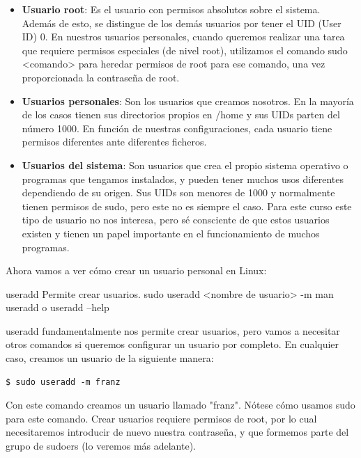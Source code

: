 \begin{itemize}
    \item \textbf{Usuario root}: Es el usuario con permisos absolutos sobre el sistema. Además de esto, se distingue de los demás usuarios por tener el UID (User ID) 0. En nuestros usuarios personales, cuando queremos realizar una tarea que requiere permisos especiales (de nivel root), utilizamos el comando sudo <comando> para heredar permisos de root para ese comando, una vez proporcionada la contraseña de root.

    \item \textbf{Usuarios personales}: Son los usuarios que creamos nosotros. En la mayoría de los casos tienen sus directorios propios en /home y sus UIDs parten del número 1000. En función de nuestras configuraciones, cada usuario tiene permisos diferentes ante diferentes ficheros.

    \item \textbf{Usuarios del sistema}: Son usuarios que crea el propio sistema operativo o programas que tengamos instalados, y pueden tener muchos usos diferentes dependiendo de su origen. Sus UIDs son menores de 1000 y normalmente tienen permisos de sudo, pero este no es siempre el caso. Para este curso este tipo de usuario no nos interesa, pero sé consciente de que estos usuarios existen y tienen un papel importante en el funcionamiento de muchos programas.
\end{itemize}

Ahora vamos a ver cómo crear un usuario personal en Linux:

\begin{command-info}
{useradd}
{Permite crear usuarios.}
{sudo useradd <nombre de usuario>}
{-m}
{man useradd o useradd --help}
\end{command-info}

useradd fundamentalmente nos permite crear usuarios, pero vamos a necesitar otros comandos si queremos configurar un usuario por completo. En cualquier caso, creamos un usuario de la siguiente manera:

\begin{tcolorbox-code}
\begin{lstlisting}
$ sudo useradd -m franz
\end{lstlisting}
\end{tcolorbox-code}

Con este comando creamos un usuario llamado "franz". Nótese cómo usamos sudo para este comando. Crear usuarios requiere permisos de root, por lo cual necesitaremos introducir de nuevo nuestra contraseña, y que formemos parte del grupo de sudoers (lo veremos más adelante). 

